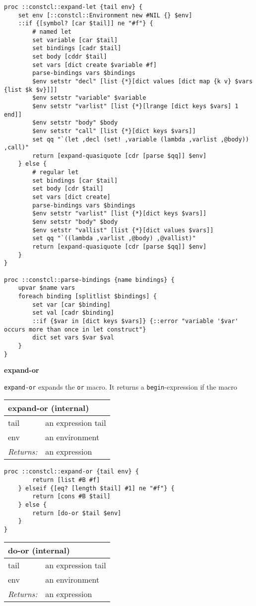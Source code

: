 \documentclass{report}
\begin{document}
\noindent\makebox[\linewidth]{\rule{\linewidth}{0.4pt}}
\begin{lstlisting}
proc ::constcl::expand-let {tail env} {
    set env [::constcl::Environment new #NIL {} $env]
    ::if {[symbol? [car $tail]] ne "#f"} {
        # named let
        set variable [car $tail]
        set bindings [cadr $tail]
        set body [cddr $tail]
        set vars [dict create $variable #f]
        parse-bindings vars $bindings
        $env setstr "decl" [list {*}[dict values [dict map {k v} $vars {list $k $v}]]]
        $env setstr "variable" $variable
        $env setstr "varlist" [list {*}[lrange [dict keys $vars] 1 end]]
        $env setstr "body" $body
        $env setstr "call" [list {*}[dict keys $vars]]
        set qq "`(let ,decl (set! ,variable (lambda ,varlist ,@body)) ,call)"
        return [expand-quasiquote [cdr [parse $qq]] $env]
    } else {
        # regular let
        set bindings [car $tail]
        set body [cdr $tail]
        set vars [dict create]
        parse-bindings vars $bindings
        $env setstr "varlist" [list {*}[dict keys $vars]]
        $env setstr "body" $body
        $env setstr "vallist" [list {*}[dict values $vars]]
        set qq "`((lambda ,varlist ,@body) ,@vallist)"
        return [expand-quasiquote [cdr [parse $qq]] $env]
    }
}
 
proc ::constcl::parse-bindings {name bindings} {
    upvar $name vars
    foreach binding [splitlist $bindings] {
        set var [car $binding]
        set val [cadr $binding]
        ::if {$var in [dict keys $vars]} {::error "variable '$var' occurs more than once in let construct"}
        dict set vars $var $val
    }
}
\end{lstlisting}
\noindent\makebox[\linewidth]{\rule{\linewidth}{0.4pt}}

\textbf{expand-or}


\texttt{expand-or} expands the \texttt{or} macro. It returns a \texttt{begin}-expression if the macro

\begin{tabular}{ |l l| }
\hline
\multicolumn{2}{|l|}{expand-or (internal)} \\
\hline
tail & an expression tail \\
env & an environment \\
\textit{Returns:} & an expression \\
\hline
\end{tabular}

\noindent\makebox[\linewidth]{\rule{\linewidth}{0.4pt}}
\begin{lstlisting}
proc ::constcl::expand-or {tail env} {
        return [list #B #f]
    } elseif {[eq? [length $tail] #1] ne "#f"} {
        return [cons #B $tail]
    } else {
        return [do-or $tail $env]
    }
}
\end{lstlisting}
\noindent\makebox[\linewidth]{\rule{\linewidth}{0.4pt}}
\begin{tabular}{ |l l| }
\hline
\multicolumn{2}{|l|}{do-or (internal)} \\
\hline
tail & an expression tail \\
env & an environment \\
\textit{Returns:} & an expression \\
\hline
\end{tabular}
\end{document}
